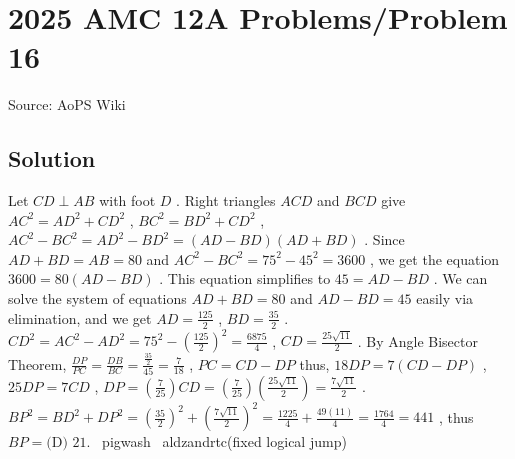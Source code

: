 \documentclass[12pt]{article}
\begin{document}
\section*{{2025 AMC 12A Problems/Problem 16}}
Source: AoPS Wiki

\subsection*{Solution}
Let $CD \perp AB$ with foot $D$ . Right triangles $ACD$ and $BCD$ give $AC^2 = AD^2+CD^2$ , $BC^2 = BD^2+CD^2$ , $AC^2-BC^2 = AD^2-BD^2 =(AD-BD)(AD+BD)$ . Since $AD+BD = AB = 80$ and $AC^2-BC^2 = 75^2-45^2 = 3600$ , we get the equation $3600 = 80(AD-BD)$ . This equation simplifies to $45 = AD - BD$ . We can solve the system of equations $AD + BD = 80$ and $AD - BD = 45$ easily via elimination, and we get $AD = \frac{125}{2}$ , $BD = \frac{35}{2}$ . $CD^2 = AC^2-AD^2 = 75^2-\left(\frac{125}{2}\right)^2 = \frac{6875}{4}$ , $CD = \frac{25\sqrt{11}}{2}$ . By Angle Bisector Theorem, $\frac{DP}{PC} = \frac{DB}{BC} = \frac{\frac{35}{2}}{45} = \frac{7}{18}$ , $PC = CD-DP$ thus, $18DP = 7(CD-DP)$ , $25DP = 7CD$ , $DP = \left(\frac{7}{25}\right)CD = \left(\frac{7}{25}\right)\left(\frac{25\sqrt{11}}{2}\right) = \frac{7\sqrt{11}}{2}$ . $BP^2 = BD^2+DP^2 = \left(\frac{35}{2}\right)^2+\left(\frac{7\sqrt{11}}{2}\right)^2 = \frac{1225}{4}+\frac{49(11)}{4} = \frac{1764}{4} = 441$ , thus $BP = \boxed{\text{(D) }21}.$ ~pigwash
~aldzandrtc(fixed logical jump)
\end{document}
